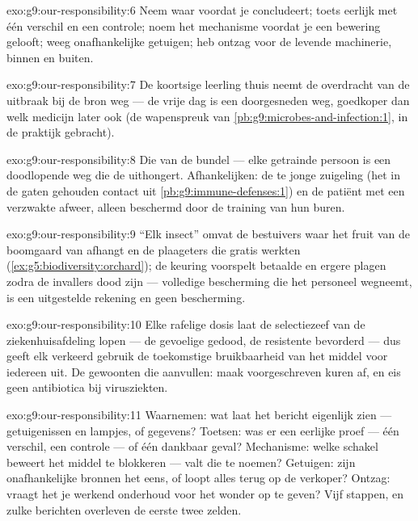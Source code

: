 \begin{solution}{exo:g9:our-responsibility:6}
Neem waar voordat je concludeert; toets eerlijk met één verschil en
een controle; noem het mechanisme voordat je een bewering gelooft;
weeg onafhankelijke getuigen; heb ontzag voor de levende
machinerie, binnen en buiten.
\end{solution}

\begin{solution}{exo:g9:our-responsibility:7}
De koortsige leerling thuis neemt de overdracht van de uitbraak bij
de bron weg --- de vrije dag is een doorgesneden weg, goedkoper dan
welk medicijn later ook (de wapenspreuk van
\cref{pb:g9:microbes-and-infection:1}, in de praktijk
gebracht).
\end{solution}

\begin{solution}{exo:g9:our-responsibility:8}
Die van de bundel --- elke getrainde persoon is een doodlopende weg
die de  uithongert. Afhankelijken: de te jonge
zuigeling (het in de gaten gehouden contact uit
\cref{pb:g9:immune-defenses:1}) en de patiënt met een verzwakte
afweer, alleen beschermd door de training van hun buren.
\end{solution}

\begin{solution}{exo:g9:our-responsibility:9}
``Elk insect'' omvat de bestuivers waar het fruit van de boomgaard
van afhangt en de plaageters die gratis werkten
(\cref{ex:g5:biodiversity:orchard}); de keuring voorspelt betaalde
 en ergere plagen zodra de invallers dood zijn ---
volledige bescherming die het personeel wegneemt, is een uitgestelde
rekening en geen bescherming.
\end{solution}

\begin{solution}{exo:g9:our-responsibility:10}
Elke rafelige dosis laat de selectiezeef van de ziekenhuisafdeling
lopen --- de gevoelige  gedood, de resistente bevorderd ---
dus geeft elk verkeerd gebruik de toekomstige bruikbaarheid van het
middel voor iedereen uit. De gewoonten die aanvullen: maak
voorgeschreven kuren af, en eis geen antibiotica bij virusziekten.
\end{solution}

\begin{solution}{exo:g9:our-responsibility:11}
Waarnemen: wat laat het bericht eigenlijk zien --- getuigenissen en
lampjes, of gegevens? Toetsen: was er een eerlijke proef --- één
verschil, een controle --- of één dankbaar geval? Mechanisme: welke
schakel beweert het middel te blokkeren --- valt die te noemen?
Getuigen: zijn onafhankelijke bronnen het eens, of loopt alles terug
op de verkoper? Ontzag: vraagt het je werkend onderhoud voor het
wonder op te geven? Vijf stappen, en zulke berichten overleven de
eerste twee zelden.
\end{solution}

